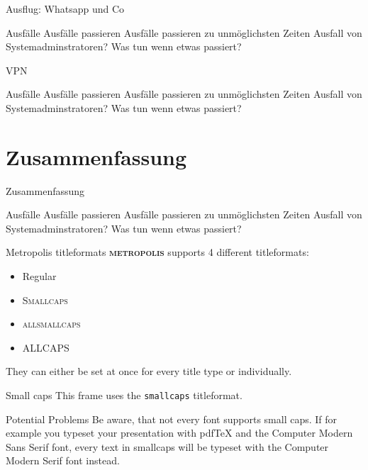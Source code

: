 \documentclass[10pt]{beamer}
\newcommand{\themename}{\textbf{\textsc{metropolis}}\xspace}
\begin{document}
\begin{frame}[fragile]{Ausflug: Whatsapp und Co}
\begin{alertblock}{Ausfälle}
	Ausfälle passieren
	Ausfälle passieren zu unmöglichsten Zeiten
	Ausfall von Systemadminstratoren?
	Was tun wenn etwas passiert?
\end{alertblock}
\end{frame}

\begin{frame}[fragile]{VPN}
\begin{alertblock}{Ausfälle}
	Ausfälle passieren
	Ausfälle passieren zu unmöglichsten Zeiten
	Ausfall von Systemadminstratoren?
	Was tun wenn etwas passiert?
\end{alertblock}
\end{frame}

\section{Zusammenfassung}

\begin{frame}[fragile]{Zusammenfassung}
\begin{alertblock}{Ausfälle}
	Ausfälle passieren
	Ausfälle passieren zu unmöglichsten Zeiten
	Ausfall von Systemadminstratoren?
	Was tun wenn etwas passiert?
\end{alertblock}
\end{frame}



\begin{frame}{Metropolis titleformats}
	\themename supports 4 different titleformats:
	\begin{itemize}
		\item Regular
		\item \textsc{Smallcaps}
		\item \textsc{allsmallcaps}
		\item ALLCAPS
	\end{itemize}
	They can either be set at once for every title type or individually.
\end{frame}

{
\begin{frame}{Small caps}
	This frame uses the \texttt{smallcaps} titleformat.

	\begin{alertblock}{Potential Problems}
		Be aware, that not every font supports small caps. If for example you typeset your presentation with pdfTeX and the Computer Modern Sans Serif font, every text in smallcaps will be typeset with the Computer Modern Serif font instead.
	\end{alertblock}
\end{frame}
}
\end{document}
